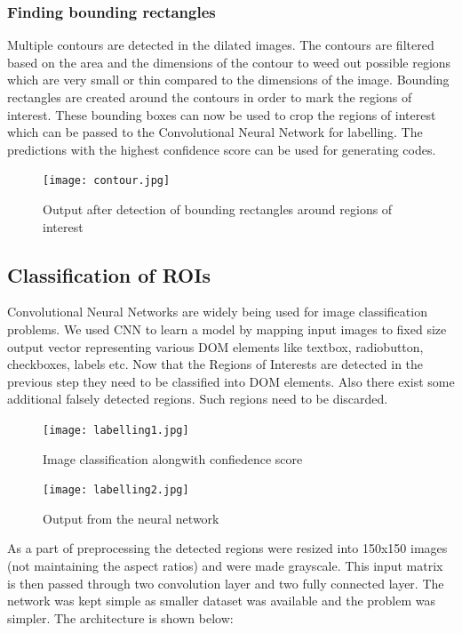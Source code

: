       \subsubsection{Finding bounding rectangles}
        Multiple contours are detected in the dilated images. The contours are filtered based on the area and the dimensions of the contour to weed out possible regions which are very small or thin compared to the dimensions of the image. Bounding rectangles are created around the contours in order to mark the regions of interest. These bounding boxes can now be used to crop the regions of interest which can be passed to the Convolutional Neural Network for labelling. The predictions with the highest confidence score can be used for generating codes.
        \begin{figure}[H]
      		\centering
      		\texttt{[image: contour.jpg]}
      		\caption
      		{Output after detection of bounding rectangles around regions of interest}
      	\end{figure}

    \subsection{Classification of ROIs}
      Convolutional Neural Networks are widely being used for image classification problems. We used CNN to learn a model by mapping input images to fixed size output vector representing various DOM elements like textbox, radiobutton, checkboxes, labels etc. Now that the Regions of Interests are detected in the previous step they need to be classified into DOM elements. Also there exist some additional falsely detected regions. Such regions need to be discarded.
      \begin{figure}[H]
        \centering
        \texttt{[image: labelling1.jpg]}
        \caption
        {Image classification alongwith confiedence score}
      \end{figure}

      \begin{figure}[H]
        \centering
        \texttt{[image: labelling2.jpg]}
        \caption
        {Output from the neural network}
      \end{figure}

      As a part of preprocessing the detected regions were resized into 150x150 images (not maintaining the aspect ratios) and were made grayscale. This input matrix is then passed through two convolution layer and two fully connected layer. The network was kept simple as smaller dataset was available and the problem was simpler. The architecture is shown below:

